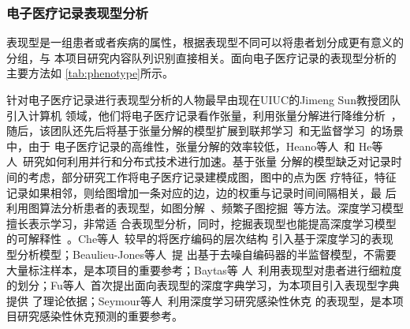 {}

\subsubsection{电子医疗记录表现型分析}

表现型是一组患者或者疾病的属性，根据表现型不同可以将患者划分成更有意义的分组，与
本项目研究内容队列识别直接相关。面向电子医疗记录的表现型分析的主要方法如
\cref{tab:phenotype}所示。

针对电子医疗记录进行表现型分析的人物最早由现在UIUC的Jimeng Sun教授团队引入计算机
领域，他们将电子医疗记录看作张量，利用张量分解进行降维分析~，随后，该团队还先后将基于张量分解的模型扩展到联邦学习~和无监督学习~的场景中，由于
电子医疗记录的高维性，张量分解的效率较低，Heano等人~和
He等人~研究如何利用并行和分布式技术进行加速。基于张量
分解的模型缺乏对记录时间的考虑，部分研究工作将电子医疗记录建模成图，图中的点为医
疗特征，特征记录如果相邻，则给图增加一条对应的边，边的权重与记录时间间隔相关，最
后利用图算法分析患者的表现型，如图分解~、频繁子图挖掘~等方法。深度学习模型擅长表示学习，非常适
合表现型分析，同时，挖掘表现型也能提高深度学习模型的可解释性~。Che等人~较早的将医疗编码的层次结构
引入基于深度学习的表现型分析模型；Beaulieu-Jones等人~提
出基于去噪自编码器的半监督模型，不需要大量标注样本，是本项目的重要参考；Baytas等
人~利用表现型对患者进行细粒度的划分；Fu等人~首次提出面向表现型的深度字典学习，为本项目引入表现型字典提供
了理论依据；Seymour等人~利用深度学习研究感染性休克
的表现型，是本项目研究感染性休克预测的重要参考。

